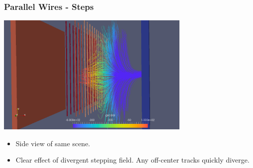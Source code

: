 \documentclass[xcolor=dvipsnames]{beamer}
\begin{document}
\begin{frame}
  \frametitle{Parallel Wires - Steps}
  \begin{center}
    \includegraphics[width=0.7\textwidth]{twodee-fine-drift-steps-side.png}    
  \end{center}
  \begin{itemize}\footnotesize
  \item Side view of same scene.
  \item Clear effect of divergent stepping field.  Any off-center tracks quickly diverge.
  \end{itemize}
\end{frame}
\end{document}
